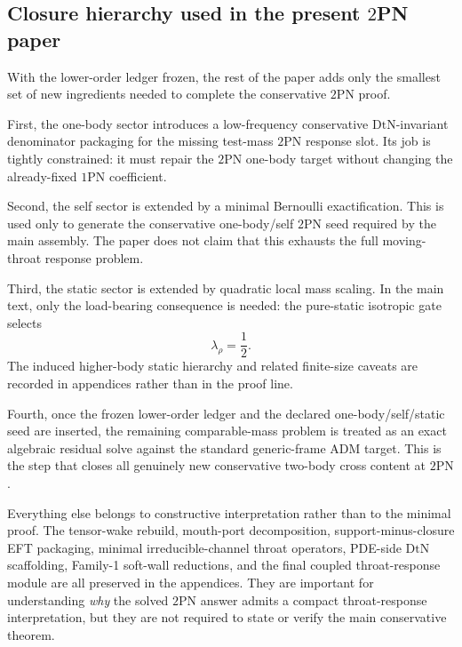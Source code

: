 \documentclass[11pt]{article}
\newcommand{\OnePN}{\mathrm{1PN}}
\newcommand{\TwoPN}{\mathrm{2PN}}
\newcommand{\ADM}{\mathrm{ADM}}
\newcommand{\DtN}{\mathrm{DtN}}
\begin{document}
\subsection{Closure hierarchy used in the present \texorpdfstring{$2$}{2}PN paper}
\label{sec:carry-forward-closure-hierarchy}

With the lower-order ledger frozen, the rest of the paper adds only the smallest set of
new ingredients needed to complete the conservative \(\TwoPN\) proof.

First, the one-body sector introduces a low-frequency conservative
\(\DtN\)-invariant denominator packaging for the missing test-mass \(\TwoPN\) response
slot. Its job is tightly constrained: it must repair the \(\TwoPN\) one-body target
without changing the already-fixed \(\OnePN\) coefficient.

Second, the self sector is extended by a minimal Bernoulli exactification. This is used
only to generate the conservative one-body/self \(\TwoPN\) seed required by the main
assembly. The paper does not claim that this exhausts the full moving-throat response
problem.

Third, the static sector is extended by quadratic local mass scaling. In the main text,
only the load-bearing consequence is needed: the pure-static isotropic gate selects
\begin{equation}
\lambda_\rho=\frac12.
\label{eq:carry-forward-lambda-rho}
\end{equation}
The induced higher-body static hierarchy and related finite-size caveats are recorded in
appendices rather than in the proof line.

Fourth, once the frozen lower-order ledger and the declared one-body/self/static seed are
inserted, the remaining comparable-mass problem is treated as an exact algebraic residual
solve against the standard generic-frame \(\ADM\) target. This is the step that closes
all genuinely new conservative two-body cross content at \(\TwoPN\).

Everything else belongs to constructive interpretation rather than to the minimal proof.
The tensor-wake rebuild, mouth-port decomposition, support-minus-closure EFT packaging,
minimal irreducible-channel throat operators, PDE-side \(\DtN\) scaffolding, Family-1
soft-wall reductions, and the final coupled throat-response module are all preserved in
the appendices. They are important for understanding \emph{why} the solved \(\TwoPN\)
answer admits a compact throat-response interpretation, but they are not required to
state or verify the main conservative theorem.
\end{document}
